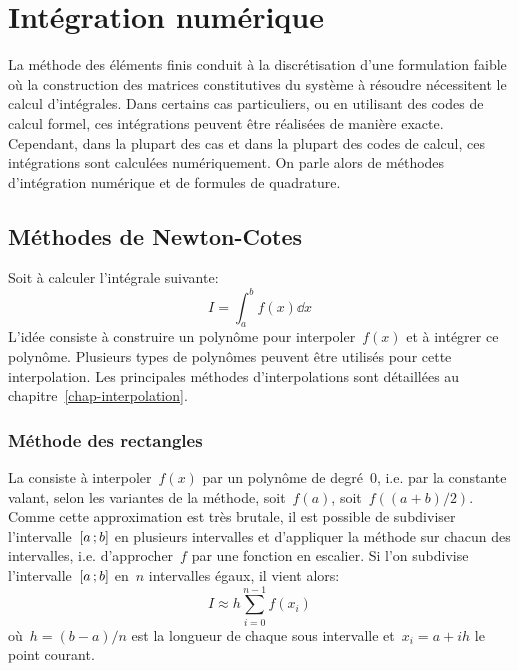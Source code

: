 \chapter{Intégration numérique}\label{chap-quadrature} 

\ifVersionDuDocEstVincent\vspace{10mm}\fi
La méthode des éléments finis conduit à la discrétisation d'une formulation faible où la construction des matrices constitutives du système à résoudre nécessitent le calcul d'intégrales. Dans certains cas particuliers, ou en utilisant des codes de calcul formel, ces intégrations peuvent être réalisées de manière exacte. Cependant, dans la plupart des cas et dans la plupart des codes de calcul, ces intégrations sont calculées numériquement. On parle alors de méthodes d'intégration numérique et de formules de quadrature. 

\medskip
\section{Méthodes de Newton-Cotes}

Soit à calculer l'intégrale suivante: 
\begin{equation}
I=\int_a^b f(x)\dd x
\end{equation}
L'idée consiste à construire un polynôme pour interpoler~$f(x)$ et à intégrer ce polynôme. Plusieurs types de polynômes peuvent être utilisés pour cette interpolation. Les principales méthodes d'interpolations sont détaillées au chapitre~\ref{chap-interpolation}. 

\medskip
\subsection*{Méthode des rectangles}

La  consiste à interpoler~$f(x)$ par un polynôme de degré~$0$, i.e. par la constante valant, selon les variantes de la méthode, soit~$f(a)$, soit~$f((a+b)/2)$. Comme cette approximation est très brutale, il est possible de subdiviser l'intervalle~$\mathopen{[}a\,;b\mathclose{]}$ en plusieurs intervalles et d'appliquer la méthode sur chacun des intervalles, i.e. d'approcher~$f$ par une fonction en escalier. Si l'on subdivise l'intervalle~$\mathopen{[}a\,;b\mathclose{]}$ en~$n$ intervalles égaux, il vient alors: 
\begin{equation}
I\approx h\sum_{i=0}^{n-1} f(x_i)
\end{equation}
où~$h=(b-a)/n$ est la longueur de chaque sous intervalle et~$x_i=a+ih$ le point courant. 


